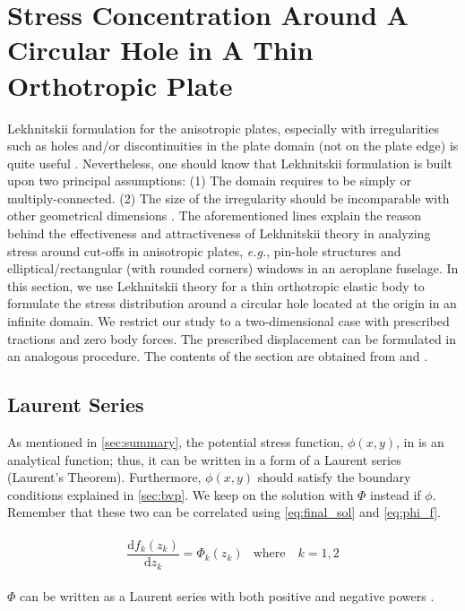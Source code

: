 \documentclass{article}
\begin{document}
\section{Stress Concentration Around A Circular Hole in A Thin Orthotropic Plate}
Lekhnitskii formulation for the anisotropic plates, especially with irregularities such as holes and/or discontinuities in the plate domain (not on the plate edge) is quite useful \cite{Koussios2009}. Nevertheless, one should know that Lekhnitskii formulation is built upon two principal assumptions: (1) The domain requires to be simply or multiply-connected. (2) The size of the irregularity should be incomparable with other geometrical dimensions \cite{Lekhnitskii1968}. The aforementioned lines explain the reason behind the effectiveness and attractiveness of Lekhnitskii theory in analyzing stress around cut-offs in anisotropic plates, \emph{e.g.}, pin-hole structures and elliptical/rectangular (with rounded corners) windows in an aeroplane fuselage. In this section, we use Lekhnitskii theory for a thin orthotropic elastic body to formulate the stress distribution around a circular hole located at the origin in an infinite domain. We restrict our study to a two-dimensional case with prescribed tractions and zero body forces. The prescribed displacement can be formulated in an analogous procedure. The contents of the section are obtained from \cite{Koussios2009} and \cite{Koussios2015}.

\subsection{Laurent Series}
As mentioned in \cref{sec:summary}, the potential stress function, $\phi(x, y)$, in  is an analytical function; thus, it can be written in a form of a Laurent series (Laurent's Theorem). Furthermore, $\phi(x, y)$ should satisfy the boundary conditions explained in \cref{sec:bvp}. We keep on the solution with $\Phi$ instead if $\phi$. Remember that these two can be correlated using \cref{eq:final_sol} and \cref{eq:phi_f}.

\begin{align}
    \begin{matrix}
    \dfrac{\mathrm{d} f_k(z_k)}{\mathrm{d} z_k} = \Phi_k(z_k) &
    \text{where} \quad k = 1, 2
    \end{matrix}
    \label{eq:phi_f}
\end{align}

$\Phi$ can be written as a Laurent series with both positive and negative powers \cite{Koussios2015}. 
\end{document}
